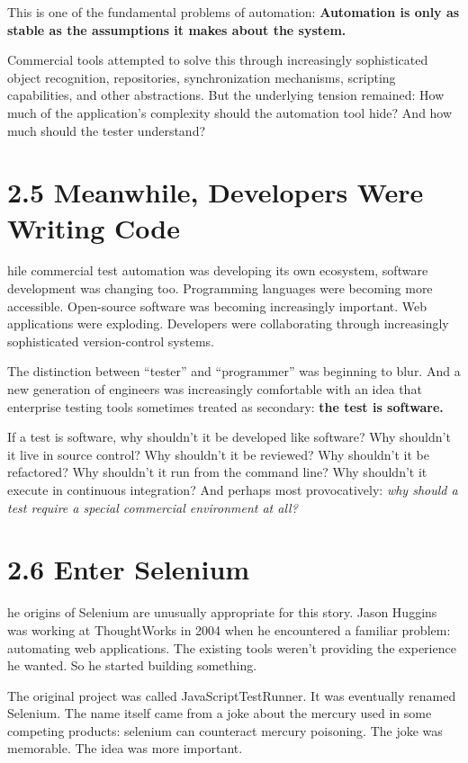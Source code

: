\documentclass[11pt, a4paper, openany]{book}
\newcommand{\initialcap}[1]{{\fontfamily{lmss}\selectfont\huge\textbf{#1}}}
\begin{document}
This is one of the fundamental problems of automation: \textbf{Automation is only as stable as the assumptions it makes about the system.}

Commercial tools attempted to solve this through increasingly sophisticated object recognition, repositories, synchronization mechanisms, scripting capabilities, and other abstractions. But the underlying tension remained: How much of the application's complexity should the automation tool hide? And how much should the tester understand?

\section{2.5 Meanwhile, Developers Were Writing Code}
\noindent \initialcap{W}hile commercial test automation was developing its own ecosystem, software development was changing too. Programming languages were becoming more accessible. Open-source software was becoming increasingly important. Web applications were exploding. Developers were collaborating through increasingly sophisticated version-control systems.

The distinction between ``tester'' and ``programmer'' was beginning to blur. And a new generation of engineers was increasingly comfortable with an idea that enterprise testing tools sometimes treated as secondary: \textbf{the test is software.}

If a test is software, why shouldn't it be developed like software? Why shouldn't it live in source control? Why shouldn't it be reviewed? Why shouldn't it be refactored? Why shouldn't it run from the command line? Why shouldn't it execute in continuous integration? And perhaps most provocatively: \textit{why should a test require a special commercial environment at all?}

\section{2.6 Enter Selenium}
\noindent \initialcap{T}he origins of Selenium are unusually appropriate for this story. Jason Huggins was working at ThoughtWorks in 2004 when he encountered a familiar problem: automating web applications. The existing tools weren't providing the experience he wanted. So he started building something.

The original project was called JavaScriptTestRunner. It was eventually renamed Selenium. The name itself came from a joke about the mercury used in some competing products: selenium can counteract mercury poisoning. The joke was memorable. The idea was more important.
\end{document}
